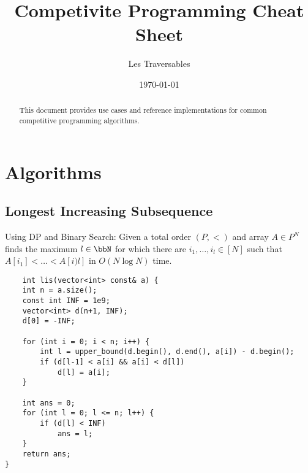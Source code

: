\documentclass[11pt]{amsart}
\title{Competivite Programming Cheat Sheet}
\author{Les Traversables}
\date{\today}
\begin{document}
\begin{abstract}
    This document provides use cases and reference implementations for common competitive programming algorithms. 
\end{abstract}

\maketitle

\section{Algorithms}

\subsection{Longest Increasing Subsequence} Using DP and Binary Search: Given a total order $(P,<)$ and array $A\in P^N$ finds the maximum $l\in\bbN$ for which there are $i_1, \dots , i_l \in [N]$ such that $A[i_1] < \dots < A[i)l]$ in $O(N \log N)$ time.
\begin{verbatim}
    int lis(vector<int> const& a) {
    int n = a.size();
    const int INF = 1e9;
    vector<int> d(n+1, INF);
    d[0] = -INF;

    for (int i = 0; i < n; i++) {
        int l = upper_bound(d.begin(), d.end(), a[i]) - d.begin();
        if (d[l-1] < a[i] && a[i] < d[l])
            d[l] = a[i];
    }

    int ans = 0;
    for (int l = 0; l <= n; l++) {
        if (d[l] < INF)
            ans = l;
    }
    return ans;
}
\end{verbatim}
\end{document}
